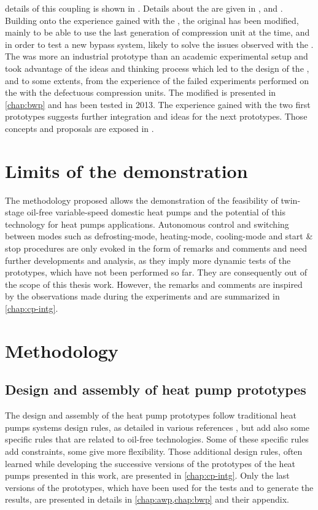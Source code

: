 details of this coupling is shown in . Details
about the \AWP{} are given in , and
. Building onto the experience gained with
the \AWP{}, the original \BWP{} has been modified, mainly to be able
to use the last generation of compression unit at the time, and in
order to test a new bypass system, likely to solve the issues observed
with the \AWP{}. The \AWP{} was more an industrial prototype than an
academic experimental setup and took advantage of the ideas and
thinking process which led to the design of the \BWP{}, and to some
extents, from the experience of the failed experiments performed on
the \BWP{} with the defectuous compression units. The modified \BWP{}
is presented in \cref{chap:bwp} and has been tested in 2013. The
experience gained with the two first prototypes suggests further
integration and ideas for the next prototypes. Those concepts and
proposals are exposed in .

\section{Limits of the demonstration}
\label{sec:methodo-limits}

The methodology proposed allows the demonstration of the feasibility
of twin-stage oil-free variable-speed domestic heat pumps and the
potential of this technology for heat pumps applications. Autonomous
control and switching between modes such as defrosting-mode,
heating-mode, cooling-mode and start \& stop procedures are only
evoked in the form of remarks and comments and need further
developments and analysis, as they imply more dynamic tests of the
prototypes, which have not been performed so far. They are consequently
out of the scope of this thesis work. However, the remarks and
comments are inspired by the observations made during the experiments
and are summarized in \cref{chap:cp-intg}.


\section{Methodology}
\label{sec:methodology}

\subsection{Design and assembly of heat pump prototypes}
\label{sec:methodo-design}

The design and assembly of the heat pump prototypes follow traditional
heat pumps systems design rules, as detailed in various references
\citep{rapin-desmons-2011a,Brown-1997a,Smith-Zappe-2004a,ASHRAE-HVACeq-2008a-HX,ASHRAE-HVACeq-2008a-Valves},
but add also some specific rules that are related to oil-free
technologies. Some of these specific rules add constraints, some give
more flexibility. Those additional design rules, often learned while
developing the successive versions of the prototypes of the heat pumps
presented in this work, are presented in \cref{chap:cp-intg}. Only the
last versions of the prototypes, which have been used for the tests
and to generate the results, are presented in details in
\cref{chap:awp,chap:bwp} and their appendix.

